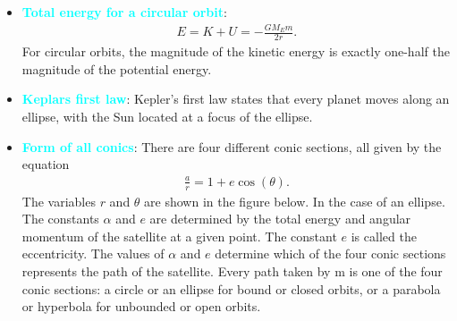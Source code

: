 \documentclass{report}
\begin{document}
\begin{itemize}
        \item \textbf{\textcolor{cyan}{Total energy for a circular orbit}}:
            \begin{align*}
               E = K + U = -\frac{GM_{E}m}{2r} 
            .\end{align*}
            \bigbreak \noindent 
            For circular orbits, the magnitude of the kinetic energy is exactly one-half the magnitude of the potential energy.
        \item \textbf{\textcolor{cyan}{Keplars first law}}: Kepler’s first law states that every planet moves along an ellipse, with the Sun located at a focus of the ellipse.
        \item \textbf{\textcolor{cyan}{Form of all conics}}: There are four different conic sections, all given by the equation
            \begin{align*}
                \frac{a}{r} = 1+e\cos{\left(\theta \right)}
            .\end{align*}
            \bigbreak \noindent 
            The variables $r$ and $\theta$ are shown in the figure below. In the case of an ellipse. The constants $\alpha$ and $e$ are determined by the total energy and angular momentum of the satellite at a given point. The constant $e$ is called the eccentricity. The values of $\alpha$ and $e$ determine which of the four conic sections represents the path of the satellite.
            \bigbreak \noindent 
            \bigbreak \noindent 
            Every path taken by m is one of the four conic sections: a circle or an ellipse for bound or closed orbits, or a parabola or hyperbola for unbounded or open orbits.



\end{itemize}
\end{document}
